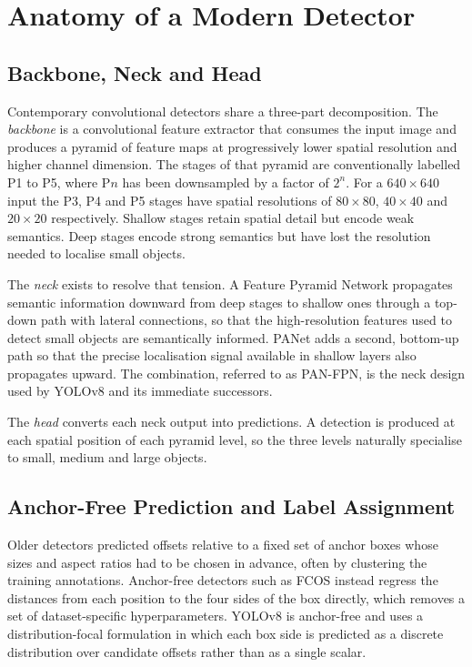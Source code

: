 \documentclass[MScCS]{uccthesis}
\begin{document}
\section{Anatomy of a Modern Detector}
\label{sec:detector_anatomy}

\subsection{Backbone, Neck and Head}

Contemporary convolutional detectors share a three-part decomposition. The
\emph{backbone} is a convolutional feature extractor that consumes the input
image and produces a pyramid of feature maps at progressively lower spatial
resolution and higher channel dimension. The stages of that pyramid are
conventionally labelled P1 to P5, where P$n$ has been downsampled by a factor
of $2^{n}$. For a $640 \times 640$ input the P3, P4 and P5 stages have spatial
resolutions of $80 \times 80$, $40 \times 40$ and $20 \times 20$ respectively.
Shallow stages retain spatial detail but encode weak semantics. Deep stages
encode strong semantics but have lost the resolution needed to localise small
objects.

The \emph{neck} exists to resolve that tension. A Feature Pyramid Network
\parencite{lin2017fpn} propagates semantic information downward from deep
stages to shallow ones through a top-down path with lateral connections, so
that the high-resolution features used to detect small objects are
semantically informed. PANet \parencite{liu2018panet} adds a second,
bottom-up path so that the precise localisation signal available in shallow
layers also propagates upward. The combination, referred to as PAN-FPN, is the
neck design used by YOLOv8 and its immediate successors.

The \emph{head} converts each neck output into predictions. A detection is
produced at each spatial position of each pyramid level, so the three levels
naturally specialise to small, medium and large objects.

\subsection{Anchor-Free Prediction and Label Assignment}

Older detectors predicted offsets relative to a fixed set of anchor boxes whose
sizes and aspect ratios had to be chosen in advance, often by clustering the
training annotations. Anchor-free detectors such as FCOS
\parencite{tian2019fcos} instead regress the distances from each position to
the four sides of the box directly, which removes a set of dataset-specific
hyperparameters. YOLOv8 is anchor-free and uses a distribution-focal
formulation in which each box side is predicted as a discrete distribution over
candidate offsets rather than as a single scalar.
\end{document}
